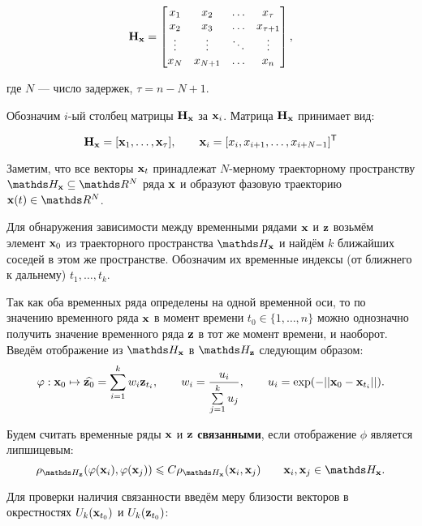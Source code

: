 \documentclass[a4paper, 12pt]{article}
\begin{document}
\begin{equation*} \label{eq:traj_mat}
	\mathbf{H}_{\mathbf{x}} = \begin{bmatrix}
		x_1 & x_2 & \ldots & x_{\tau} \\
		x_2 & x_3 & \ldots & x_{\tau+1} \\
		\vdots & \vdots & \ddots & \vdots \\
		x_{N} & x_{N+1} & \ldots & x_n
	\end{bmatrix}, 
\end{equation*} 

где $N$ --- число задержек, $\tau = n - N + 1$.

Обозначим $i\text{-ый}$ столбец матрицы $\mathbf{H}_{\mathbf{x}}$ за $\mathbf{x}_i$. 
Матрица $\mathbf{H}_{\mathbf{x}}$ принимает вид:

\begin{equation*} \label{eq:traj_mat_short}
	\mathbf{H}_{\mathbf{x}} = [\mathbf{x}_1, \ldots, \mathbf{x}_{\tau}], \qquad \mathbf{x}_i = [x_i, x_{i+1}, \ldots, x_{i+N-1}]^{\mathsf{T}} 
\end{equation*}

Заметим, что все векторы $\mathbf{x}_t$ принадлежат $N\text{-мерному}$ траекторному пространству $\dH_{\bx} \subseteq \dR^N$ ряда $\mathbf{x}$ и образуют фазовую траекторию $\bx(t) \in \dR^N$.

Для обнаружения зависимости между временными рядами $\mathbf{x}$ и $\mathbf{z}$ возьмём элемент $\mathbf{x}_0$ из траекторного пространства $\dH_{\bx}$ и найдём $k$ ближайших соседей в этом же пространстве. Обозначим их временные индексы (от ближнего к дальнему) $t_1, \ldots, t_k$.

Так как оба временных ряда определены на одной временной оси, то по значению временного ряда $\mathbf{x}$ в момент времени $t_0 \in \{ 1, \ldots, n\}$ можно однозначно получить значение временного ряда $\mathbf{z}$ в тот же момент времени, и наоборот. Введём отображение из $\dH_{\bx}$ в $\dH_{\bz}$ следующим образом: 
$$ \varphi: \mathbf{x}_0 \mapsto \widehat{\mathbf{z}_0} = \sum\limits_{i=1}^k w_i \mathbf{z}_{t_i}, \qquad 
w_i = \dfrac{u_i}{\sum\limits_{j=1}^k u_j}, \qquad
u_i = \exp(-||\mathbf{x}_0 - \mathbf{x}_{t_i}||).$$

\begin{definition}
	Будем считать временные ряды $\mathbf{x}$ и $\mathbf{z}$ \textbf{связанными}, если отображение $\phi$ является липшицевым:
	$$ \rho_{\dH_{\bz}}(\phi(\bx_i), \phi(\bx_j)) \leq C \rho_{\dH_{\bx}}(\bx_i, \bx_j) \qquad \bx_i, \bx_j \in \dH_{\bx}. $$
\end{definition}

Для проверки наличия связанности введём меру близости векторов в окрестностях $U_k(\mathbf{x}_{t_0})$ и $U_k(\mathbf{z}_{t_0})$:
\end{document}
